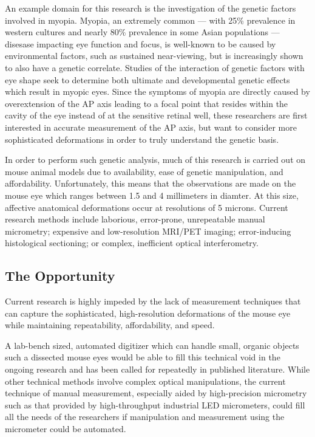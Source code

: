 \documentclass{article}
\begin{document}
An example domain for this research is the investigation of the genetic factors involved in myopia. Myopia, an extremely common --- with 25\% prevalence in western cultures and nearly 80\% prevalence in some Asian populations\cite{rajan98} --- disesase impacting eye function and focus, is well-known to be caused by environmental factors, such as sustained near-viewing, but is increasingly shown to also have a genetic correlate\cite{zhou99:genes,zhou99:models,schmucker04}. Studies of the interaction of genetic factors with eye shape seek to determine both ultimate and developmental genetic effects which result in myopic eyes. Since the symptoms of myopia are directly caused by overextension of the AP axis leading to a focal point that resides within the cavity of the eye instead of at the sensitive retinal well, these researchers are first interested in accurate measurement of the AP axis\cite{wallman04}, but want to consider more sophisticated deformations in order to truly understand the genetic basis\cite{schaeffel04}.

In order to perform such genetic analysis, much of this research is carried out on mouse animal models due to availability, ease of genetic manipulation, and affordability\cite{schaeffel04}. Unfortunately, this means that the observations are made on the mouse eye which ranges between 1.5 and 4 millimeters in diamter. At this size, affective
anatomical deformations occur at resolutions of 5 microns. Current
research methods include laborious, error-prone, unrepeatable manual
micrometry\cite{wallman04}; expensive and low-resolution MRI/PET
imaging\cite{atchison04}; error-inducing histological
sectioning\cite{schaeffel04}; or complex, inefficient optical
interferometry\cite{schaeffel04,guggenheim04}.

\subsection{The Opportunity}
\label{sec:opportunity}

Current research is highly impeded by the lack of measurement
techniques that can capture the sophisticated, high-resolution
deformations of the mouse eye while
maintaining repeatability, affordability, and speed.

A lab-bench sized, automated digitizer which can handle small, organic objects such a dissected mouse eyes would be able to fill this technical void in the ongoing research and has been called for repeatedly in published literature\cite{schaeffel04,atchison04,zhou99:genes,zhou99:models}. While other technical methods involve complex optical manipulations, the current technique of manual measurement, especially aided by high-precision micrometry such as that provided by high-throughput industrial LED micrometers, could fill all the needs of the researchers if manipulation and measurement using the micrometer could be automated.
\end{document}
